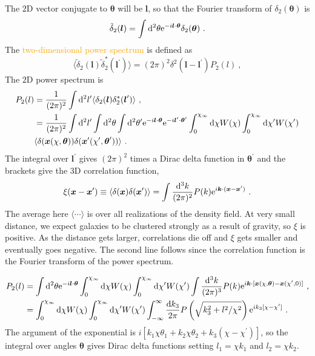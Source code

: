 \documentclass[12pt,a4paper]{article}
\renewcommand{\vec}[1]{\boldsymbol{#1}}
\newcommand{\dif}{\mathrm{d}}
\begin{document}
The $2$D vector conjugate to $\vec{\theta}$ will be $\vec{l}$, so that the Fourier transform of $\delta_2(\vec{\theta})$ is
\begin{equation}
\tilde{\delta}_2(\vec{l}) = \int \dif^2 \theta {\rm e}^{-i\vec{l}\cdot \vec{\theta}} \delta_2(\vec{\theta}) ~.
\end{equation}
The \textcolor{orange}{two-dimensional power spectrum} is defined as
 \begin{equation}
\langle \tilde{\delta}_2(\vec{l}) \tilde{\delta}_2^\ast(\vec{l}^\prime) \rangle = (2\pi)^2 \delta^2(\vec{l} -\vec{l}^\prime) P_2(l) ~,
\end{equation}
The $2$D power spectrum is
\begin{align}
\nonumber P_2(l) &= \dfrac{1}{(2\pi)^2} \int \dif^2 l^\prime \langle \delta_2(\vec{l}) \delta_2^\ast(\vec{l}^\prime) \rangle ~, \\
\nonumber &= \dfrac{1}{(2\pi)^2} \int \dif^2 l^\prime \int \dif^2 \theta \int \dif^2 \theta^\prime {\rm e}^{-i\vec{l}\cdot \vec{\theta}} {\rm e}^{-i\vec{l}^\prime \cdot \vec{\theta}^\prime } \int_0^{\chi_{\infty}} \dif \chi W(\chi) \int_0^{\chi_{\infty}} \dif \chi^\prime W(\chi^\prime) \\
\nonumber & \langle \delta(\vec{x}(\chi, \vec{\theta})) \delta(\vec{x}^\prime(\chi^\prime, \vec{\theta}^\prime)) \rangle  ~.
\end{align}
The integral over $\vec{l}^\prime$ gives $(2\pi)^2$ times a Dirac delta function in $\vec{\theta}^\prime$ and the brackets give the $3$D correlation function, 
\begin{equation}
\xi(\vec{x} - \vec{x}^\prime) \equiv \langle \delta(\vec{x}) \delta(\vec{x}^\prime) \rangle = \int \dfrac{\dif^3 k}{(2\pi)^2} P(k) {\rm e}^{i\vec{k} \cdot (\vec{x} -\vec{x}^\prime)} ~.
\end{equation}
The average here $\langle \cdots \rangle$ is over all realizations of the density field. At very small distance, we expect galaxies to be clustered strongly as a result of gravity, so $\xi$ is positive. As the distance gets larger, correlations die off and $\xi$ gets smaller and eventually goes negative. The second line follows since the correlation function is the Fourier transform of the power spectrum. 

\begin{align}
P_2(l) &=  \int \dif^2 \theta {\rm e}^{-i\vec{l}\cdot \vec{\theta}} \int_0^{\chi_{\infty}} \dif \chi W(\chi) \int_0^{\chi_{\infty}} \dif \chi^\prime W(\chi^\prime)  \int \dfrac{\dif^3 k}{(2\pi)^3} P(k) {\rm e}^{i\vec{k} \cdot [\vec{x}(\chi, \vec{\theta}) -\vec{x}(\chi^\prime, 0)]} ~, \\
&= \int_0^{\chi_{\infty}} \dif \chi W(\chi) \int_0^{\chi_{\infty}} \dif \chi^\prime W(\chi^\prime) \int_{-\infty}^\infty \dfrac{\dif k_3}{2\pi} P \left(\sqrt{k_3^2 +l^2/\chi^2} \right) {\rm e}^{ik_3 [\chi -\chi^\prime]} ~.
\end{align}
The argument of the exponential is $i[k_1 \chi \theta_1 +k_2 \chi \theta_2 +k_3(\chi -\chi^\prime)]$,  so the integral over angles $ \vec{\theta}$ gives Dirac delta functions setting $l_1 =\chi k_1$ and $l_2 = \chi k_2$.
\end{document}
